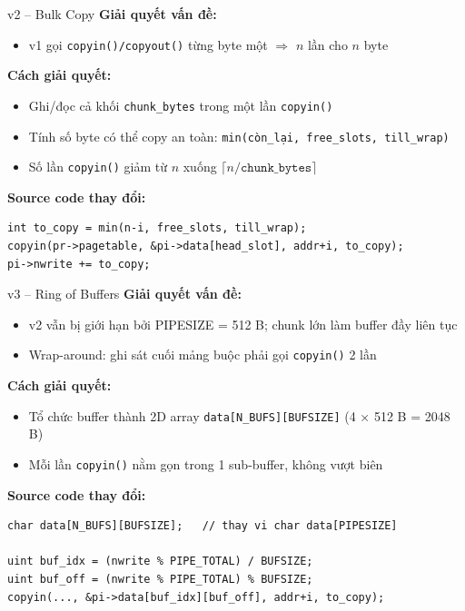 \documentclass[aspectratio=169]{beamer}
\begin{document}
\begin{frame}[fragile]{v2 -- Bulk Copy}
    \textbf{Giải quyết vấn đề:}
    \begin{itemize}
        \item v1 gọi \texttt{copyin()/copyout()} từng byte một $\Rightarrow$ $n$ lần cho $n$ byte
    \end{itemize}

    \vspace{0.4em}
    \textbf{Cách giải quyết:}
    \begin{itemize}\setlength\itemsep{3pt}
        \item Ghi/đọc cả khối \texttt{chunk\_bytes} trong một lần \texttt{copyin()}
        \item Tính số byte có thể copy an toàn: \texttt{min(còn\_lại, free\_slots, till\_wrap)}
        \item Số lần \texttt{copyin()} giảm từ $n$ xuống $\lceil n / \texttt{chunk\_bytes} \rceil$
    \end{itemize}

    \vspace{0.4em}
    \textbf{Source code thay đổi:}
\begin{lstlisting}
int to_copy = min(n-i, free_slots, till_wrap);
copyin(pr->pagetable, &pi->data[head_slot], addr+i, to_copy);
pi->nwrite += to_copy;
\end{lstlisting}
\end{frame}

\begin{frame}[fragile]{v3 -- Ring of Buffers}
    \textbf{Giải quyết vấn đề:}
    \begin{itemize}
        \item v2 vẫn bị giới hạn bởi PIPESIZE = 512 B; chunk lớn làm buffer đầy liên tục
        \item Wrap-around: ghi sát cuối mảng buộc phải gọi \texttt{copyin()} 2 lần
    \end{itemize}

    \vspace{0.4em}
    \textbf{Cách giải quyết:}
    \begin{itemize}\setlength\itemsep{3pt}
        \item Tổ chức buffer thành 2D array \texttt{data[N\_BUFS][BUFSIZE]} (4 × 512 B = 2048 B)
        \item Mỗi lần \texttt{copyin()} nằm gọn trong 1 sub-buffer, không vượt biên
    \end{itemize}

    \vspace{0.4em}
    \textbf{Source code thay đổi:}
\begin{lstlisting}
char data[N_BUFS][BUFSIZE];   // thay vi char data[PIPESIZE]

uint buf_idx = (nwrite % PIPE_TOTAL) / BUFSIZE;
uint buf_off = (nwrite % PIPE_TOTAL) % BUFSIZE;
copyin(..., &pi->data[buf_idx][buf_off], addr+i, to_copy);
\end{lstlisting}
\end{frame}
\end{document}
